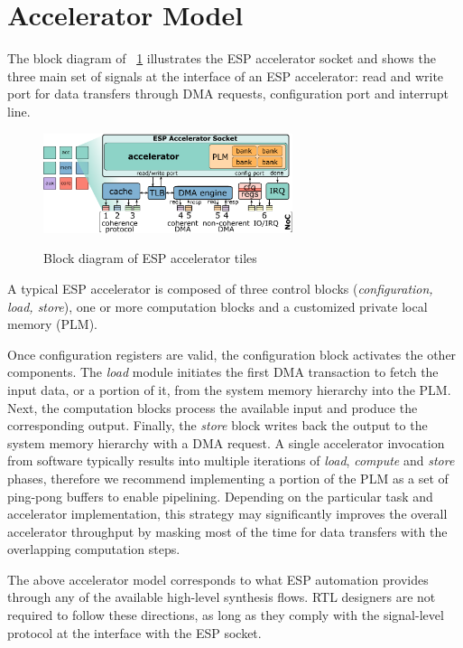 \section{Accelerator Model}

The block diagram of \figurename~\ref{fig:acctile} illustrates the ESP
accelerator socket and shows the three main set of signals at the interface of
an ESP accelerator: read and write port for data transfers through DMA requests,
configuration port and interrupt line.

\begin{figure}[h]
  \vspace{0.2in}
  \centering
  \includegraphics[width=0.65\textwidth]{../fig/acctile.pdf}
  \label{fig:acctile}
  \caption{Block diagram of ESP accelerator tiles}
\end{figure}

A typical ESP accelerator is composed of three control blocks
({\it configuration, load, store}), one or more computation blocks and a
customized private local memory (PLM).

Once configuration registers are valid, the configuration block activates the
other components. The {\it load} module initiates the first DMA transaction to
fetch the input data, or a portion of it, from the system memory hierarchy into
the PLM. Next, the computation blocks process the available input and produce
the corresponding output. Finally, the {\it store} block writes back the output
to the system memory hierarchy with a DMA request. A single accelerator
invocation from software typically results into multiple iterations of {\it
  load}, {\it compute} and {\it store} phases, therefore we
recommend implementing a portion of the PLM as a set of ping-pong buffers to
enable pipelining.
Depending on the particular task and accelerator implementation, this strategy
may significantly improves the overall accelerator throughput by masking most of
the time for data transfers with the overlapping computation steps.

The above accelerator model corresponds to what ESP automation provides
through any of the available high-level synthesis flows. RTL designers are not
required to follow these directions, as long as they comply with the
signal-level protocol at the interface with the ESP socket.


